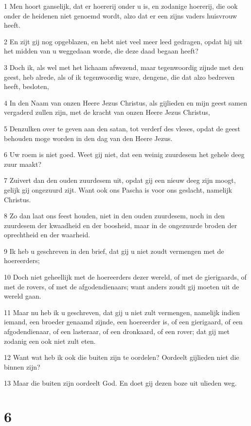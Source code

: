 \par 1 Men hoort ganselijk, dat er hoererij onder u is, en zodanige hoererij, die ook onder de heidenen niet genoemd wordt, alzo dat er een zijns vaders huisvrouw heeft.
\par 2 En zijt gij nog opgeblazen, en hebt niet veel meer leed gedragen, opdat hij uit het midden van u weggedaan worde, die deze daad begaan heeft?
\par 3 Doch ik, als wel met het lichaam afwezend, maar tegenwoordig zijnde met den geest, heb alrede, als of ik tegenwoordig ware, dengene, die dat alzo bedreven heeft, besloten,
\par 4 In den Naam van onzen Heere Jezus Christus, als gijlieden en mijn geest samen vergaderd zullen zijn, met de kracht van onzen Heere Jezus Christus,
\par 5 Denzulken over te geven aan den satan, tot verderf des vleses, opdat de geest behouden moge worden in den dag van den Heere Jezus.
\par 6 Uw roem is niet goed. Weet gij niet, dat een weinig zuurdesem het gehele deeg zuur maakt?
\par 7 Zuivert dan den ouden zuurdesem uit, opdat gij een nieuw deeg zijn moogt, gelijk gij ongezuurd zijt. Want ook ons Pascha is voor ons geslacht, namelijk Christus.
\par 8 Zo dan laat ons feest houden, niet in den ouden zuurdesem, noch in den zuurdesem der kwaadheid en der boosheid, maar in de ongezuurde broden der oprechtheid en der waarheid.
\par 9 Ik heb u geschreven in den brief, dat gij u niet zoudt vermengen met de hoereerders;
\par 10 Doch niet geheellijk met de hoereerders dezer wereld, of met de gierigaards, of met de rovers, of met de afgodendienaars; want anders zoudt gij moeten uit de wereld gaan.
\par 11 Maar nu heb ik u geschreven, dat gij u niet zult vermengen, namelijk indien iemand, een broeder genaamd zijnde, een hoereerder is, of een gierigaard, of een afgodendienaar, of een lasteraar, of een dronkaard, of een rover; dat gij met zodanig een ook niet zult eten.
\par 12 Want wat heb ik ook die buiten zijn te oordelen? Oordeelt gijlieden niet die binnen zijn?
\par 13 Maar die buiten zijn oordeelt God. En doet gij dezen boze uit ulieden weg.

\chapter{6}


